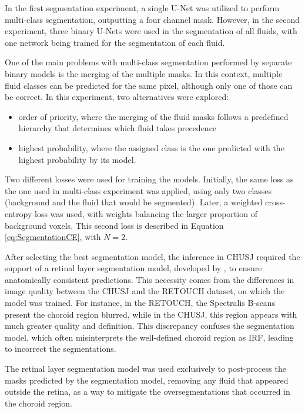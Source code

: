 In the first segmentation experiment, a single U-Net was utilized to perform multi-class segmentation, outputting a four channel mask. However, in the second experiment, three binary U-Nets were used in the segmentation of all fluids, with one network being trained for the segmentation of each fluid.
\par
One of the main problems with multi-class segmentation performed by separate binary models is the merging of the multiple masks. In this context, multiple fluid classes can be predicted for the same pixel, although only one of those can be correct. In this experiment, two alternatives were explored: 

\begin{itemize}
	\item order of priority, where the merging of the fluid masks follows a predefined hierarchy that determines which fluid takes precedence
	\item highest probability, where the assigned class is the one predicted with the highest probability by its model.
\end{itemize} 

Two different losses were used for training the models. Initially, the same loss as the one used in multi-class experiment was applied, using only two classes (background and the fluid that would be segmented). Later, a weighted cross-entropy loss was used, with weights balancing the larger proportion of background voxels. This second loss is described in Equation \ref{eq:SegmentationCE}, with $N=2$.
\par
After selecting the best segmentation model, the inference in CHUSJ required the support of a retinal layer segmentation model, developed by \textcite{Melo2023}, to ensure anatomically consistent predictions. This necessity comes from the differences in image quality between the CHUSJ and the RETOUCH dataset, on which the model was trained. For instance, in the RETOUCH, the Spectralis B-scans present the choroid region blurred, while in the CHUSJ, this region appears with much greater quality and definition. This discrepancy confuses the segmentation model, which often misinterprets the well-defined choroid region as IRF, leading to incorrect the segmentations.
\par
The retinal layer segmentation model was used exclusively to post-process the masks predicted by the segmentation model, removing any fluid that appeared outside the retina, as a way to mitigate the oversegmentations that occurred in the choroid region.

